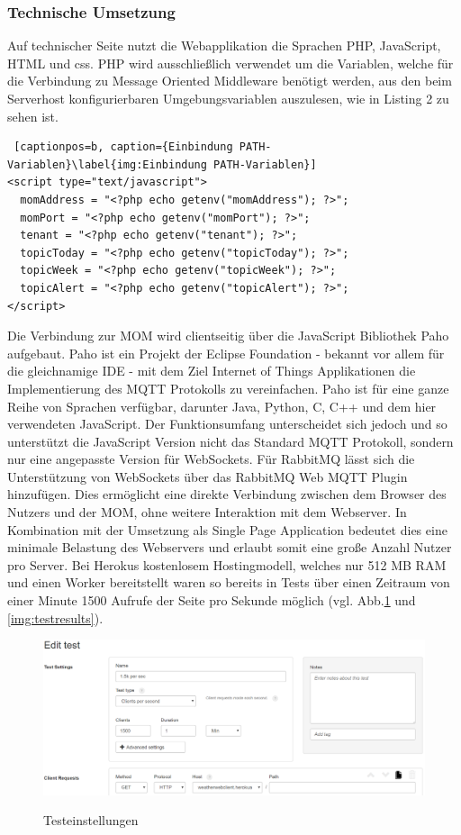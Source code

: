 \subsubsection{Technische Umsetzung}
Auf technischer Seite nutzt die Webapplikation die Sprachen PHP, JavaScript, HTML und css. PHP wird ausschließlich verwendet um die Variablen, welche für die Verbindung zu Message Oriented Middleware benötigt werden, aus den beim Serverhost konfigurierbaren Umgebungsvariablen auszulesen, wie in Listing 2 zu sehen ist.
\begin{lstlisting} [captionpos=b, caption={Einbindung PATH-Variablen}\label{img:Einbindung PATH-Variablen}]
<script type="text/javascript">
  momAddress = "<?php echo getenv("momAddress"); ?>";
  momPort = "<?php echo getenv("momPort"); ?>";
  tenant = "<?php echo getenv("tenant"); ?>";
  topicToday = "<?php echo getenv("topicToday"); ?>";
  topicWeek = "<?php echo getenv("topicWeek"); ?>";
  topicAlert = "<?php echo getenv("topicAlert"); ?>";
</script>
\end{lstlisting}
Die Verbindung zur MOM wird clientseitig über die JavaScript Bibliothek Paho aufgebaut. Paho ist ein Projekt der Eclipse Foundation - bekannt vor allem für die gleichnamige IDE - mit dem Ziel Internet of Things Applikationen die Implementierung des MQTT Protokolls zu vereinfachen. Paho ist für eine ganze Reihe von Sprachen verfügbar, darunter Java, Python, C, C++ und dem hier verwendeten JavaScript. Der Funktionsumfang unterscheidet sich jedoch und so unterstützt die JavaScript Version nicht das Standard MQTT Protokoll, sondern nur eine angepasste Version für WebSockets. Für RabbitMQ lässt sich die Unterstützung von WebSockets über das RabbitMQ Web MQTT Plugin hinzufügen. Dies ermöglicht eine direkte Verbindung zwischen dem Browser des Nutzers und der MOM, ohne weitere Interaktion mit dem Webserver.
In Kombination mit der Umsetzung als Single Page Application bedeutet dies eine minimale Belastung des Webservers und erlaubt somit eine große Anzahl Nutzer pro Server. Bei Herokus kostenlosem Hostingmodell, welches nur 512 MB RAM und einen Worker bereitstellt waren so bereits in Tests über einen Zeitraum von einer Minute 1500 Aufrufe der Seite pro Sekunde möglich (vgl. Abb.\ref{img:testsettings} und \ref{img:testresults}).
\begin{figure}[!ht]
	\centering
	\includegraphics[width=1.0\textwidth]{Bilder/Web-TestSettings.png}
	\caption{Testeinstellungen}\cite{webc:2}
	\label{img:testsettings}
\end{figure}
